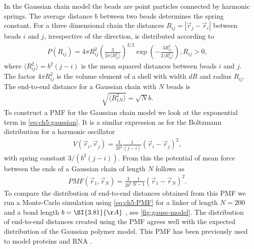 \documentclass[12pt, twoside]{report}
\begin{document}
In the Gaussian chain model the beads are point particles connected by harmonic
springs. The average distance \(b\) between two beads determines the spring
constant. For a three dimensional chain the distances $R_{ij} = |\vec{r}_j -
\vec{r}_i|$ between beads \(i\) and \(j\), irrespective of the direction, is
distributed according to \cite{yamakawa1971modern}
\begin{align}
\label{eq:ch5:gaussian} P(R_{ij}) = 4 \pi R_{ij}^2 \left(\frac{3}{2\pi \langle
R^2_{ij}\rangle}\right)^{3/2} \exp\left(-\frac{3R_{ij}^2}{2 \langle
R_{ij}^2\rangle}\right) , R_{ij} > 0,
\end{align} where \(\langle R^2_{ij}\rangle = b^2(j-i)\) is the mean squared
distances between beads \(i\) and \(j\). The factor \(4 \pi R_{ij}^2\) is the
volume element of a shell with width \(dR\) and radius \(R_{ij}\). The
end-to-end distance for a Gaussian chain with $N$ beads is
\begin{align}
\label{eq:ch5:end2end} \sqrt{\langle R^2_{1N}\rangle} = \sqrt{N}b.
\end{align} To construct a \gls{PMF} for the Gaussian chain model we look at the
exponential term in \cref{eq:ch5:gaussian}. It is a similar expression as for
the Boltzmann distribution for a harmonic oscillator
\begin{align}
  \label{eq:ch5:harmonic-oscillator} V(\vec{r}_i, \vec{r}_j) =
\frac{3}{2b^2}\frac{1}{(j-i)}(\vec{r}_i - \vec{r}_j)^2,
\end{align} with spring constant $3/(b^2(j-i))$. From this the potential of mean
force between the ends of a Gaussian chain of length $N$ follows as
\begin{align}
  \label{eq:ch5:PMF} PMF(\vec{r}_1, \vec{r}_N) = \frac{3}{2 b^2} \frac{1}{N-1}
(\vec{r}_1 - \vec{r}_N)^2.
\end{align} To compare the distribution of end-to-end distances obtained from
this \gls{PMF} we run a Monte-Carlo simulation using \cref{eq:ch5:PMF} for a
linker of length \(N=200\) and a bond length \(b=\SI{3.81}{\AA}\)
\cite{Best2005}, see \cref{fig:gauss-model}. The distribution of end-to-end
distances created using the PMF agrees well with the expected distribution of
the Gaussian polymer model. This \gls{PMF} has been previously used to model
proteins and \gls{RNA} \cite{Hyeon2008}.
\end{document}
